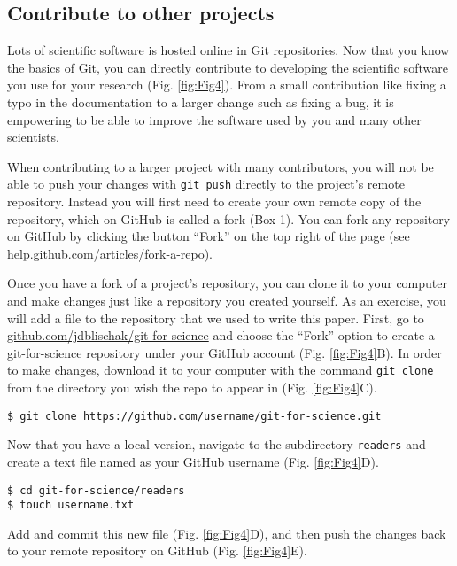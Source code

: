 \subsection*{Contribute to other projects}

Lots of scientific software is hosted online in Git repositories.
Now that you know the basics of Git, you can directly contribute to developing the scientific software you use for your research (Fig. \ref{fig:Fig4}).
From a small contribution like fixing a typo in the documentation to a larger change such as fixing a bug, it is empowering to be able to improve the software used by you and many other scientists.

When contributing to a larger project with many contributors, you will not be able to push your changes with \verb|git push| directly to the project's remote repository.
Instead you will first need to create your own remote copy of the repository, which on GitHub is called a fork (Box 1).
You can fork any repository on GitHub by clicking the button ``Fork'' on the top right of the page (see \href{https://help.github.com/articles/fork-a-repo/}{help.github.com/articles/fork-a-repo}).

Once you have a fork of a project's repository, you can clone it to your computer and make changes just like a repository you created yourself.
As an exercise, you will add a file to the repository that we used to write this paper.
First, go to \href{https://github.com/jdblischak/git-for-science}{github.com/jdblischak/git-for-science} and choose the ``Fork'' option to create a git-for-science repository under your GitHub account (Fig. \ref{fig:Fig4}B).
In order to make changes, download it to your computer with the command \verb|git clone| from the directory you wish the repo to appear in (Fig. \ref{fig:Fig4}C).

\begin{verbatim}
$ git clone https://github.com/username/git-for-science.git
\end{verbatim}

Now that you have a local version, navigate to the subdirectory \verb|readers| and create a text file named as your GitHub username (Fig. \ref{fig:Fig4}D).

\begin{verbatim}
$ cd git-for-science/readers
$ touch username.txt
\end{verbatim}

Add and commit this new file (Fig. \ref{fig:Fig4}D), and then push the changes back to your remote repository on GitHub (Fig. \ref{fig:Fig4}E).

